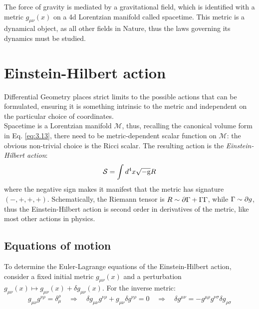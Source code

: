 
The force of gravity is mediated by a gravitational field, which is identified with a metric $ g_{\mu \nu}(x) $ on a 4d Lorentzian manifold called spacetime. This metric is a dynamical object, as all other fields in Nature, thus the laws governing its dynamics must be studied.

\section{Einstein-Hilbert action}

Differential Geometry places strict limits to the possible actions that can be formulated, ensuring it is something intrinsic to the metric and independent on the particular choice of coordinates.\\
Spacetime is a Lorentzian manifold $ \mathcal{M} $, thus, recalling the canonical volume form in Eq. \ref{eq:3.13}, there need to be metric-dependent scalar function on $ \mathcal{M} $: the obvious non-trivial choice is the Ricci scalar. The resulting action is the \textit{Einstein-Hilbert action}:
\begin{equation}
  \mathcal{S} = \int d^4 x \sqrt{-\mathrm{g}} R
  \label{eq:4.1}
\end{equation}
where the negative sign makes it manifest that the metric has signature $ (-,+,+,+) $. Schematically, the Riemann tensor is $ R \sim \partial \Gamma + \Gamma \Gamma $, while $ \Gamma \sim \partial g $, thus the Einstein-Hilbert action is second order in derivatives of the metric, like most other actions in physics.

\subsection{Equations of motion}

To determine the Euler-Lagrange equations of the Einstein-Hilbert action, consider a fixed initial metric $ g_{\mu \nu}(x) $ and a perturbation $ g_{\mu \nu}(x) \mapsto g_{\mu \nu}(x) + \delta g_{\mu \nu}(x) $. For the inverse metric:
\begin{equation*}
  g_{\mu \nu} g^{\nu \rho} = \delta_\mu^\rho
  \quad \Rightarrow \quad
  \delta g_{\mu \nu} g^{\nu \rho} + g_{\mu \nu} \delta g^{\nu \rho} = 0
  \quad \Rightarrow \quad
  \delta g^{\mu \nu} = - g^{\mu \rho} g^{\nu \sigma} \delta g_{\rho \sigma}
\end{equation*}

